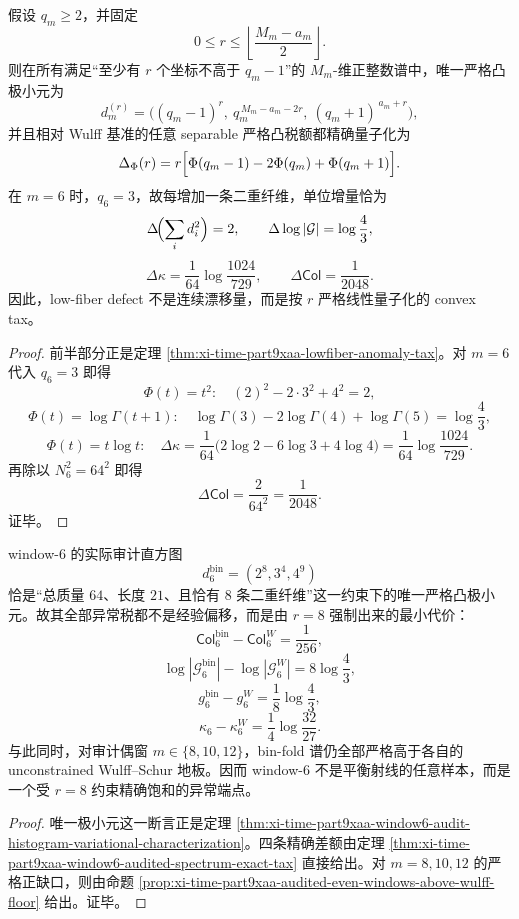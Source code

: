\begin{theorem}[低纤维异常税的线性量子化]\label{thm:xi-time-part9xaad-lowfiber-linear-quantization}
假设 \(q_m\ge 2\)，并固定
\[
0\le r\le \left\lfloor\frac{M_m-a_m}{2}\right\rfloor.
\]
则在所有满足“至少有 \(r\) 个坐标不高于 \(q_m-1\)”的 \(M_m\)-维正整数谱中，唯一严格凸极小元为
\[
d_m^{(r)}
=
\bigl((q_m-1)^r,\ q_m^{\,M_m-a_m-2r},\ (q_m+1)^{\,a_m+r}\bigr),
\]
并且相对 Wulff 基准的任意 separable 严格凸税额都精确量子化为
\[
\Delta_\Phi(r)
=
r\Bigl[\Phi(q_m-1)-2\Phi(q_m)+\Phi(q_m+1)\Bigr].
\]
在 \(m=6\) 时，\(q_6=3\)，故每增加一条二重纤维，单位增量恰为
\[
\Delta\!\Bigl(\sum_i d_i^2\Bigr)=2,
\qquad
\Delta\log|\mathcal G|=\log\frac43,
\]
\[
\Delta\kappa=\frac{1}{64}\log\frac{1024}{729},
\qquad
\Delta\mathsf{Col}=\frac{1}{2048}.
\]
因此，low-fiber defect 不是连续漂移量，而是按 \(r\) 严格线性量子化的 convex tax。
\end{theorem}
\begin{proof}
前半部分正是定理 \ref{thm:xi-time-part9xaa-lowfiber-anomaly-tax}。对 \(m=6\) 代入 \(q_6=3\) 即得
\[
\Phi(t)=t^2:\quad (2)^2-2\cdot 3^2+4^2=2,
\]
\[
\Phi(t)=\log\Gamma(t+1):\quad
\log\Gamma(3)-2\log\Gamma(4)+\log\Gamma(5)=\log\frac43,
\]
\[
\Phi(t)=t\log t:\quad
\Delta\kappa
=\frac1{64}\bigl(2\log2-6\log3+4\log4\bigr)
=\frac1{64}\log\frac{1024}{729}.
\]
再除以 \(N_6^2=64^2\) 即得
\[
\Delta\mathsf{Col}=\frac{2}{64^2}=\frac1{2048}.
\]
证毕。
\end{proof}

\begin{theorem}\label{thm:xi-time-part9xaad-window6-constrained-wulff-saturation}
window-\(6\) 的实际审计直方图
\[
d_6^{\mathrm{bin}}=(2^8,3^4,4^9)
\]
恰是“总质量 \(64\)、长度 \(21\)、且恰有 \(8\) 条二重纤维”这一约束下的唯一严格凸极小元。故其全部异常税都不是经验偏移，而是由 \(r=8\) 强制出来的最小代价：
\[
\mathsf{Col}_6^{\mathrm{bin}}-\mathsf{Col}_6^{W}=\frac1{256},
\]
\[
\log|\mathcal G_6^{\mathrm{bin}}|-\log|\mathcal G_6^{W}|=8\log\frac43,
\]
\[
g_6^{\mathrm{bin}}-g_6^{W}=\frac18\log\frac43,
\]
\[
\kappa_6-\kappa_6^{W}=\frac14\log\frac{32}{27}.
\]
与此同时，对审计偶窗 \(m\in\{8,10,12\}\)，bin-fold 谱仍全部严格高于各自的 unconstrained Wulff--Schur 地板。因而 window-\(6\) 不是平衡射线的任意样本，而是一个受 \(r=8\) 约束精确饱和的异常端点。
\end{theorem}
\begin{proof}
唯一极小元这一断言正是定理 \ref{thm:xi-time-part9xaa-window6-audit-histogram-variational-characterization}。四条精确差额由定理 \ref{thm:xi-time-part9xaa-window6-audited-spectrum-exact-tax} 直接给出。对 \(m=8,10,12\) 的严格正缺口，则由命题 \ref{prop:xi-time-part9xaa-audited-even-windows-above-wulff-floor} 给出。证毕。
\end{proof}

